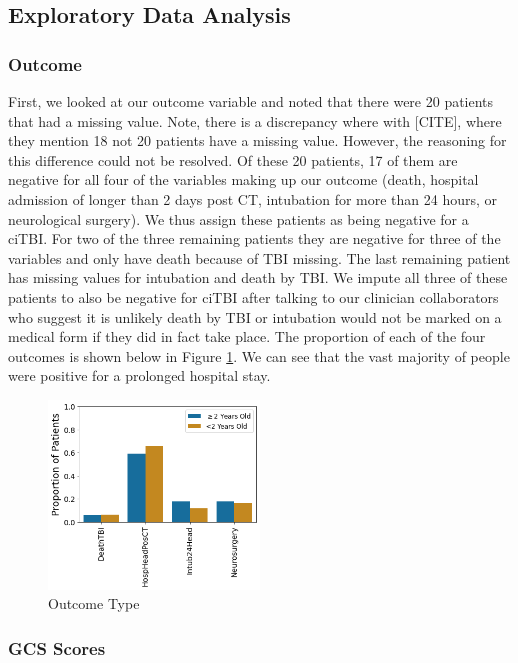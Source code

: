 \documentclass[11pt]{amsart}
\begin{document}
\subsection{Exploratory Data Analysis}

\subsubsection{Outcome}

First, we looked at our outcome variable and noted that there were 20 patients that had a missing value. Note, there is a discrepancy where with [CITE], where they mention 18 not 20 patients have a missing value. However, the reasoning for this difference could not be resolved. Of these 20 patients, 17 of them are negative for all four of the variables making up our outcome (death, hospital admission of longer than 2 days post CT, intubation for more than 24 hours, or neurological surgery). We thus assign these patients as being negative for a ciTBI. For two of the three remaining patients they are negative for three of the variables and only have death because of TBI missing. The last remaining patient has missing values for intubation and death by TBI. We impute all three of these patients to also be negative for ciTBI after talking to our clinician collaborators who suggest it is unlikely death by TBI or intubation would not be marked on a medical form if they did in fact take place. The proportion of each of the four outcomes is shown below in Figure \ref{fig:outcome_type}. We can see that the vast majority of people were positive for a prolonged hospital stay.
\FloatBarrier
\begin{figure}
	\centering
	\includegraphics[width=0.5\textwidth]{outcome_type.png}
	\caption{Outcome Type}\label{fig:outcome_type}
\end{figure}
\FloatBarrier

\subsubsection{GCS Scores}
\end{document}
